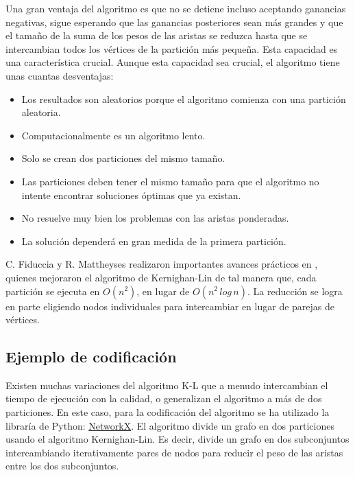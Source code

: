 Una gran ventaja del algoritmo es que no se detiene incluso aceptando ganancias negativas, sigue esperando que las ganancias posteriores sean más grandes y que el tamaño de la suma de los pesos de las aristas se reduzca hasta que se intercambian todos los vértices de la partición más pequeña. Esta capacidad es una característica crucial. Aunque esta capacidad sea crucial, el algoritmo tiene unas cuantas desventajas:

\begin{itemize}
	\item Los resultados son aleatorios porque el algoritmo comienza con una partición aleatoria.
	\item Computacionalmente es un algoritmo lento.
	\item Solo se crean dos particiones del mismo tamaño.
	\item Las particiones deben tener el mismo tamaño para que el algoritmo no intente encontrar soluciones óptimas que ya existan.
	\item No resuelve muy bien los problemas con las aristas ponderadas.
	\item La solución dependerá en gran medida de la primera partición.
\end{itemize}



C. Fiduccia y R. Mattheyses realizaron importantes avances prácticos en \cite{FiducciaMattheyses}, quienes mejoraron el algoritmo de  Kernighan-Lin\cite{KernighanLin} de tal manera que, cada partición se ejecuta en $O({n}^2)$, en lugar de $O({n}^2 \, log \, n)$. La reducción se logra en parte eligiendo nodos individuales para intercambiar en lugar de parejas de vértices.

\subsection{Ejemplo de codificación}\label{Kernighan-Lin-ejemplo}

Existen muchas variaciones del algoritmo K-L que a menudo intercambian el tiempo de ejecución con la calidad, o generalizan el algoritmo a más de dos particiones. En este caso, para la codificación del algoritmo se ha utilizado la libraría de Python: \href{https://networkx.github.io/documentation/stable/reference/algorithms/generated/networkx.algorithms.community.kernighan_lin.kernighan_lin_bisection.html}{NetworkX}. El algoritmo divide un grafo en dos particiones usando el algoritmo Kernighan-Lin\cite{KernighanLin}. Es decir, divide un grafo en dos subconjuntos intercambiando iterativamente pares de nodos para reducir el peso de las aristas entre los dos subconjuntos.


